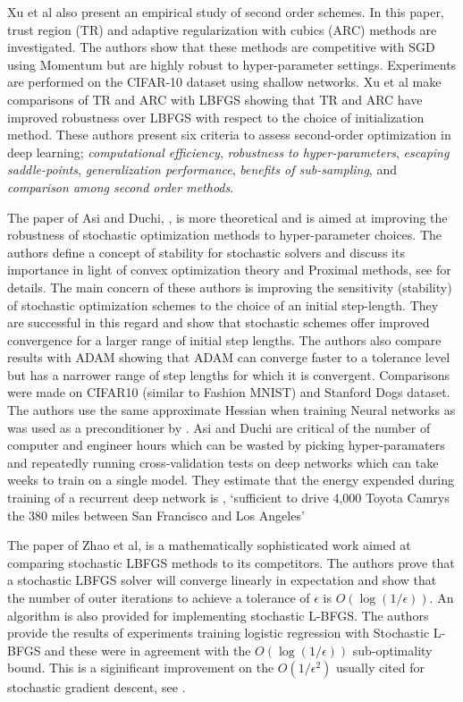\documentclass[11pt,twocolumn]{article}
\begin{document}
Xu et al  \cite{Xu:2ndNCML} also present an empirical study of second order schemes. In this paper, trust region (TR) and adaptive regularization with cubics  (ARC) methods are investigated. The authors show that these methods are competitive with SGD using Momentum but are highly robust to hyper-parameter settings. Experiments are performed on the CIFAR-10 dataset using shallow networks. Xu et al make comparisons of TR and ARC with LBFGS showing that TR and ARC have improved robustness over LBFGS with respect to the  choice of initialization method. These authors present six criteria to assess second-order optimization in deep learning; \textit{computational efficiency}, \textit{robustness to hyper-parameters}, \textit{escaping saddle-points}, \textit{generalization performance}, \textit{benefits of sub-sampling}, and   \textit{comparison among second order methods}.

The paper of Asi and Duchi, \cite{Asi:BetterStoch}, is more theoretical and is aimed at improving the robustness of stochastic optimization methods to hyper-parameter choices. The authors define a concept of stability for stochastic solvers and discuss its importance in light of convex optimization theory and Proximal methods, see \cite{Boyd:Vanden} for details. The main concern of these authors is improving the sensitivity (stability) of stochastic optimization schemes to the choice of an initial step-length. They are successful in this regard and show that stochastic schemes offer improved convergence for a larger range of initial step lengths. The authors also compare results with ADAM showing that ADAM can converge faster to a tolerance level but has a narrower range of step lengths for which it is convergent. Comparisons were made on CIFAR10 (similar to Fashion MNIST) and Stanford Dogs dataset. The authors use the same approximate Hessian when training Neural networks as was used as a preconditioner by \cite{Martens:Deep}. Asi and Duchi are critical of the number of computer and engineer hours which can be wasted by picking hyper-paramaters and repeatedly running cross-validation tests on deep networks which can take weeks to train on a single model. They estimate that the energy expended during training of a recurrent deep network is \cite{Collinsetal:RNN} , `sufficient to drive 4,000 Toyota Camrys the 380 miles between San Francisco and Los Angeles'

The paper of Zhao et al, \cite{Zhao:SLBFGS} is a mathematically sophisticated work aimed at comparing stochastic LBFGS methods to its competitors. The authors prove that a stochastic LBFGS solver will converge linearly in expectation and show that the number of outer iterations to achieve a tolerance of $\epsilon$ is $O(\log(1/\epsilon))$. An algorithm is also provided for implementing stochastic L-BFGS. The authors provide the results of experiments training logistic regression with Stochastic L-BFGS and these were in agreement with the  $O(\log(1/\epsilon))$ sub-optimality bound. This is a siginificant improvement on the $O(1/\epsilon^2)$ usually cited for stochastic gradient descent, see \cite{Srebro:StochOpt}.
\end{document}
